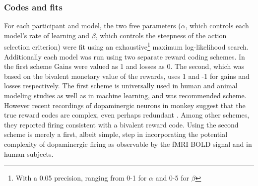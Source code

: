 \subsubsection{Codes and fits}
\label{subsub:codesandfits}
For each participant and model, the two free parameters ($\alpha$, which controls each model's rate of learning and $\beta$, which controls the steepness of the action selection criterion) were fit using an exhaustive\footnote{With a 0.05 precision, ranging from 0-1 for $\alpha$ and 0-5 for $\beta$} maximum log-likelihood search.  Additionally each model was run using two separate reward coding schemes.  In the first scheme Gains were valued as 1 and losses as 0.  The second, which was based on the bivalent monetary value of the rewards, uses 1 and -1 for gains and losses respectively.  The first scheme is universally used in human and animal modeling studies as well as in machine learning, and was  recommended scheme.  However recent recordings of dopaminergic neurons in monkey suggest that the true reward codes are complex, even perhaps redundant \cite{Kim:2006p1063,Matsumoto:2009p7219}.  Among other schemes, they reported firing consistent with a bivalent reward code.  Using the second scheme is merely a first, albeit simple, step in incorporating the potential complexity of dopaminergic firing as observable by the fMRI BOLD signal and in human subjects.

